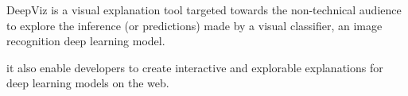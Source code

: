 DeepViz is a visual explanation tool targeted towards the non-technical audience to explore the inference (or predictions) made by a visual classifier, an image recognition deep learning model.

it also enable developers to create interactive and explorable explanations for deep learning models on the web.

